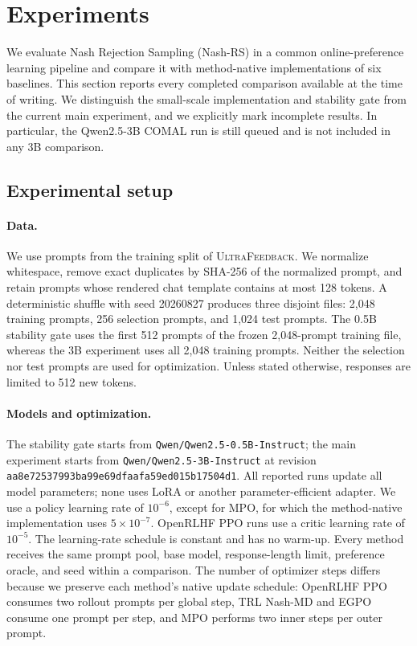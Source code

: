 
\section{Experiments}
\label{sec:experiments}

We evaluate Nash Rejection Sampling (Nash-RS) in a common online-preference
learning pipeline and compare it with method-native implementations of six
baselines.  This section reports every completed comparison available at the
time of writing.  We distinguish the small-scale implementation and stability
gate from the current main experiment, and we explicitly mark incomplete
results.  In particular, the Qwen2.5-3B COMAL run is still queued and is not
included in any 3B comparison.

\subsection{Experimental setup}
\label{sec:experimental-setup}

\paragraph{Data.}
We use prompts from the training split of \textsc{UltraFeedback}.  We normalize
whitespace, remove exact duplicates by SHA-256 of the normalized prompt, and
retain prompts whose rendered chat template contains at most 128 tokens.  A
deterministic shuffle with seed 20260827 produces three disjoint files: 2,048
training prompts, 256 selection prompts, and 1,024 test prompts.  The 0.5B
stability gate uses the first 512 prompts of the frozen 2,048-prompt training
file, whereas the 3B experiment uses all 2,048 training prompts.  Neither the
selection nor test prompts are used for optimization.  Unless stated
otherwise, responses are limited to 512 new tokens.

\paragraph{Models and optimization.}
The stability gate starts from \texttt{Qwen/Qwen2.5-0.5B-Instruct}; the main
experiment starts from \texttt{Qwen/Qwen2.5-3B-Instruct} at revision
\texttt{aa8e72537993ba99e69dfaafa59ed015b17504d1}.  All reported runs update all
model parameters; none uses LoRA or another parameter-efficient adapter.  We
use a policy learning rate of $10^{-6}$, except for MPO, for which the
method-native implementation uses $5\times10^{-7}$.  OpenRLHF PPO runs use a
critic learning rate of $10^{-5}$.  The learning-rate schedule is constant and
has no warm-up.  Every method receives the same prompt pool, base model,
response-length limit, preference oracle, and seed within a comparison.  The
number of optimizer steps differs because we preserve each method's native
update schedule: OpenRLHF PPO consumes two rollout prompts per global step,
TRL Nash-MD and EGPO consume one prompt per step, and MPO performs two inner
steps per outer prompt.

